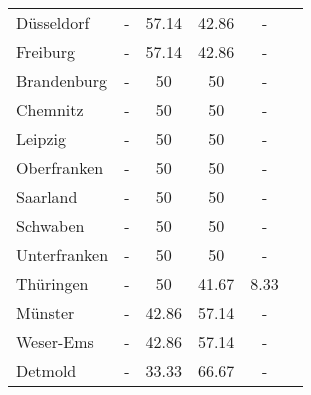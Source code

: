 \begin{table}[H]
\begin{tabularx}{\textwidth}{Xccccc}
            Düsseldorf & - & 57.14 & 42.86 & - \\
            Freiburg & - & 57.14 & 42.86 & - \\
            Brandenburg & - & 50 & 50 & - \\
            Chemnitz & - & 50 & 50 & - \\
            Leipzig & - & 50 & 50 & - \\
            Oberfranken & - & 50 & 50 & - \\
            Saarland & - & 50 & 50 & - \\
            Schwaben & - & 50 & 50 & - \\
            Unterfranken & - & 50 & 50 & - \\
            Thüringen & - & 50 & 41.67 & 8.33 \\
            Münster & - & 42.86 & 57.14 & - \\
            Weser-Ems & - & 42.86 & 57.14 & - \\
            Detmold & - & 33.33 & 66.67 & - \\
        \bottomrule
    \end{tabularx}
\end{table}
    